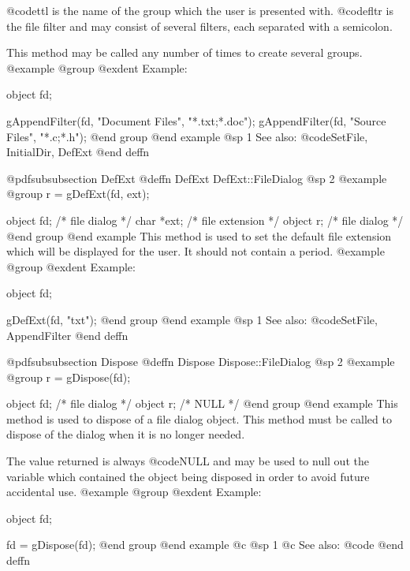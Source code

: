 @code{ttl} is the name of the group which the user is presented with.
@code{fltr} is the file filter and may consist of several filters,
each separated with a semicolon.

This method may be called any number of times to create several groups.
@example
@group
@exdent Example:

object  fd;

gAppendFilter(fd, "Document Files", "*.txt;*.doc");
gAppendFilter(fd, "Source Files", "*.c;*.h");
@end group
@end example
@sp 1
See also:  @code{SetFile, InitialDir, DefExt}
@end deffn














@pdfsubsubsection {DefExt}
@deffn {DefExt} DefExt::FileDialog
@sp 2
@example
@group
r = gDefExt(fd, ext);

object  fd;     /*  file dialog     */
char    *ext;   /*  file extension  */
object  r;      /*  file dialog     */
@end group
@end example
This method is used to set the default file extension which will be
displayed for the user.  It should not contain a period.
@example
@group
@exdent Example:

object  fd;

gDefExt(fd, "txt");
@end group
@end example
@sp 1
See also:  @code{SetFile, AppendFilter}
@end deffn






@pdfsubsubsection {Dispose}
@deffn {Dispose} Dispose::FileDialog
@sp 2
@example
@group
r = gDispose(fd);

object  fd;   /*  file dialog  */
object  r;    /*  NULL         */
@end group
@end example
This method is used to dispose of a file dialog object.  This method must
be called to dispose of the dialog when it is no longer needed.

The value returned is always @code{NULL} and may be used to null out
the variable which contained the object being disposed in order to
avoid future accidental use.
@example
@group
@exdent Example:

object  fd;

fd = gDispose(fd);
@end group
@end example
@c @sp 1
@c See also:  @code{}
@end deffn











